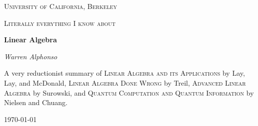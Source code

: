 \documentclass[a4paper,10pt]{book}
\theoremstyle{plain}
\theoremstyle{plain}
\theoremstyle{definition}
\begin{document}
\frontmatter 
{\let\cleardoublepage\clearpage 

\begin{titlepage}
	\centering
	\vspace{1cm}
	{\scshape\LARGE University of California, Berkeley \par}
	\vspace{4cm}
	{\scshape\Large Literally everything I know about \par}
	\vspace{1.5cm}
	{\Huge\bfseries Linear Algebra\par}
	\vspace{1cm}
	\vspace{2.5cm}
	{\Large\itshape Warren Alphonso\par}
	\vfill
	{\large A very reductionist summary of \textsc{Linear Algebra and its Applications} by Lay, Lay, and McDonald, \textsc{Linear Algebra Done Wrong} by Treil, \textsc{Advanced Linear Algebra} by Surowski, and \textsc{Quantum Computation and Quantum Information} by Nielsen and Chuang. \par}
	\vfill
	{\large \today\par}
\end{titlepage}

\tableofcontents
}

\mainmatter








%

\end{document}

